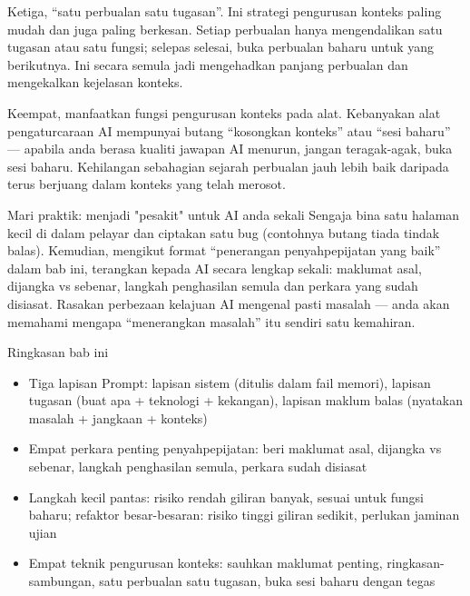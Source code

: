 Ketiga, “satu perbualan satu tugasan”. Ini strategi pengurusan konteks paling mudah dan juga paling berkesan. Setiap perbualan hanya mengendalikan satu tugasan atau satu fungsi; selepas selesai, buka perbualan baharu untuk yang berikutnya. Ini secara semula jadi mengehadkan panjang perbualan dan mengekalkan kejelasan konteks.

Keempat, manfaatkan fungsi pengurusan konteks pada alat. Kebanyakan alat pengaturcaraan AI mempunyai butang “kosongkan konteks” atau “sesi baharu” — apabila anda berasa kualiti jawapan AI menurun, jangan teragak-agak, buka sesi baharu. Kehilangan sebahagian sejarah perbualan jauh lebih baik daripada terus berjuang dalam konteks yang telah merosot.

\begin{tcbpractice}{Mari praktik: menjadi "pesakit" untuk AI anda sekali}
Sengaja bina satu halaman kecil di dalam pelayar dan ciptakan satu bug (contohnya butang tiada tindak balas). Kemudian, mengikut format “penerangan penyahpepijatan yang baik” dalam bab ini, terangkan kepada AI secara lengkap sekali: maklumat asal, dijangka vs sebenar, langkah penghasilan semula dan perkara yang sudah disiasat. Rasakan perbezaan kelajuan AI mengenal pasti masalah — anda akan memahami mengapa “menerangkan masalah” itu sendiri satu kemahiran.

\end{tcbpractice}

\begin{tcbsummary}{Ringkasan bab ini}
\begin{itemize}
  \item Tiga lapisan Prompt: lapisan sistem (ditulis dalam fail memori), lapisan tugasan (buat apa + teknologi + kekangan), lapisan maklum balas (nyatakan masalah + jangkaan + konteks)
  \item Empat perkara penting penyahpepijatan: beri maklumat asal, dijangka vs sebenar, langkah penghasilan semula, perkara sudah disiasat
  \item Langkah kecil pantas: risiko rendah giliran banyak, sesuai untuk fungsi baharu; refaktor besar-besaran: risiko tinggi giliran sedikit, perlukan jaminan ujian
  \item Empat teknik pengurusan konteks: sauhkan maklumat penting, ringkasan-sambungan, satu perbualan satu tugasan, buka sesi baharu dengan tegas
\end{itemize}

\end{tcbsummary}
